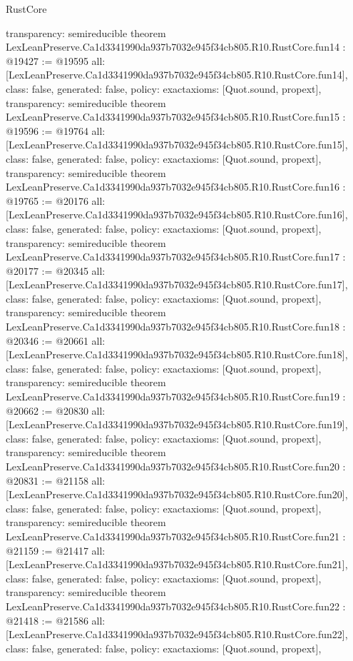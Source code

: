\begin{lexlean}{RustCore}
\begin{coremodule}
{  transparency: semireducible
}
theorem LexLeanPreserve.Ca1d3341990da937b7032e945f34cb805.R10.RustCore.fun14 : @19427 := @19595 {
  all: [LexLeanPreserve.Ca1d3341990da937b7032e945f34cb805.R10.RustCore.fun14],
  class: false,
  generated: false,
  policy: exact{axioms: [Quot.sound, propext]},
  transparency: semireducible
}
theorem LexLeanPreserve.Ca1d3341990da937b7032e945f34cb805.R10.RustCore.fun15 : @19596 := @19764 {
  all: [LexLeanPreserve.Ca1d3341990da937b7032e945f34cb805.R10.RustCore.fun15],
  class: false,
  generated: false,
  policy: exact{axioms: [Quot.sound, propext]},
  transparency: semireducible
}
theorem LexLeanPreserve.Ca1d3341990da937b7032e945f34cb805.R10.RustCore.fun16 : @19765 := @20176 {
  all: [LexLeanPreserve.Ca1d3341990da937b7032e945f34cb805.R10.RustCore.fun16],
  class: false,
  generated: false,
  policy: exact{axioms: [Quot.sound, propext]},
  transparency: semireducible
}
theorem LexLeanPreserve.Ca1d3341990da937b7032e945f34cb805.R10.RustCore.fun17 : @20177 := @20345 {
  all: [LexLeanPreserve.Ca1d3341990da937b7032e945f34cb805.R10.RustCore.fun17],
  class: false,
  generated: false,
  policy: exact{axioms: [Quot.sound, propext]},
  transparency: semireducible
}
theorem LexLeanPreserve.Ca1d3341990da937b7032e945f34cb805.R10.RustCore.fun18 : @20346 := @20661 {
  all: [LexLeanPreserve.Ca1d3341990da937b7032e945f34cb805.R10.RustCore.fun18],
  class: false,
  generated: false,
  policy: exact{axioms: [Quot.sound, propext]},
  transparency: semireducible
}
theorem LexLeanPreserve.Ca1d3341990da937b7032e945f34cb805.R10.RustCore.fun19 : @20662 := @20830 {
  all: [LexLeanPreserve.Ca1d3341990da937b7032e945f34cb805.R10.RustCore.fun19],
  class: false,
  generated: false,
  policy: exact{axioms: [Quot.sound, propext]},
  transparency: semireducible
}
theorem LexLeanPreserve.Ca1d3341990da937b7032e945f34cb805.R10.RustCore.fun20 : @20831 := @21158 {
  all: [LexLeanPreserve.Ca1d3341990da937b7032e945f34cb805.R10.RustCore.fun20],
  class: false,
  generated: false,
  policy: exact{axioms: [Quot.sound, propext]},
  transparency: semireducible
}
theorem LexLeanPreserve.Ca1d3341990da937b7032e945f34cb805.R10.RustCore.fun21 : @21159 := @21417 {
  all: [LexLeanPreserve.Ca1d3341990da937b7032e945f34cb805.R10.RustCore.fun21],
  class: false,
  generated: false,
  policy: exact{axioms: [Quot.sound, propext]},
  transparency: semireducible
}
theorem LexLeanPreserve.Ca1d3341990da937b7032e945f34cb805.R10.RustCore.fun22 : @21418 := @21586 {
  all: [LexLeanPreserve.Ca1d3341990da937b7032e945f34cb805.R10.RustCore.fun22],
  class: false,
  generated: false,
  policy: exact{axioms: [Quot.sound, propext]},
}
\end{coremodule}
\end{lexlean}
